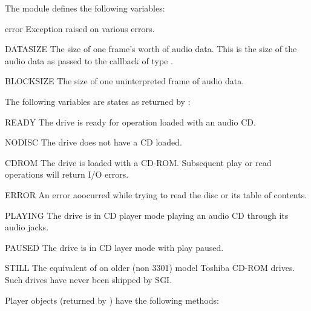 The module defines the following variables:

\begin{datadesc}{error}
Exception raised on various errors.
\end{datadesc}

\begin{datadesc}{DATASIZE}
The size of one frame's worth of audio data.  This is the size of the
audio data as passed to the callback of type .
\end{datadesc}

\begin{datadesc}{BLOCKSIZE}
The size of one uninterpreted frame of audio data.
\end{datadesc}

The following variables are states as returned by :

\begin{datadesc}{READY}
The drive is ready for operation loaded with an audio CD.
\end{datadesc}

\begin{datadesc}{NODISC}
The drive does not have a CD loaded.
\end{datadesc}

\begin{datadesc}{CDROM}
The drive is loaded with a CD-ROM.  Subsequent play or read operations
will return I/O errors.
\end{datadesc}

\begin{datadesc}{ERROR}
An error aoocurred while trying to read the disc or its table of
contents.
\end{datadesc}

\begin{datadesc}{PLAYING}
The drive is in CD player mode playing an audio CD through its audio
jacks.
\end{datadesc}

\begin{datadesc}{PAUSED}
The drive is in CD layer mode with play paused.
\end{datadesc}

\begin{datadesc}{STILL}
The equivalent of  on older (non 3301) model Toshiba
CD-ROM drives.  Such drives have never been shipped by SGI.
\end{datadesc}

Player objects (returned by ) have the following
methods:

